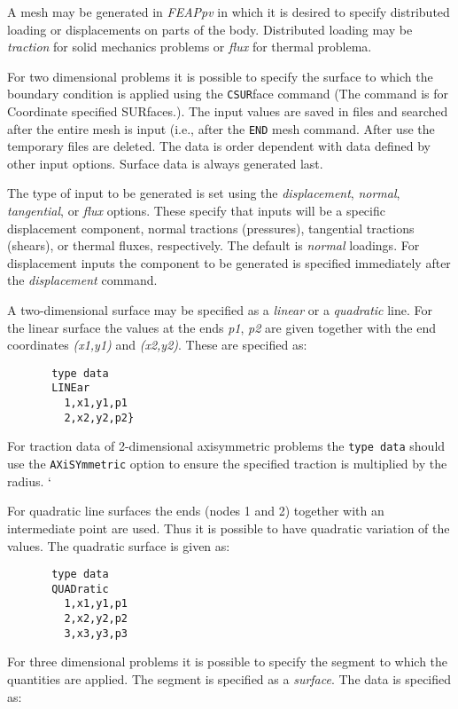 A mesh may be generated in {\sl FEAPpv} in which it is
desired to specify distributed loading or displacements on parts of the
body. Distributed loading may be  \textit{traction} for solid mechanics
problems or \textit{flux} for thermal problema.

For two dimensional problems it is possible to
specify the surface to which the boundary condition is applied
using the {\tt CSUR}face command (The command is for Coordinate
specified SURfaces.).
The input values are saved in files and searched
after the entire mesh is input (i.e., after the {\tt END} mesh command.
After use the temporary files are deleted.
The data is order dependent with data
defined by other input options.  Surface data is always generated last.

The type of input to be generated is set using the \textit{displacement},
\textit{normal}, \textit{tangential}, or \textit{flux}  options.  These specify that inputs
will be a specific
displacement component, normal tractions (pressures), tangential
tractions (shears), or thermal fluxes, respectively.  The default is \textit{normal} loadings.
For displacement inputs the component to be generated is specified
immediately after the {\it displacement} command.

A two-dimensional surface may be specified as a
{\it linear} or a {\it quadratic} line.  For the linear surface the
values at the ends {\it p1}, {\it p2} are given together with 
the end coordinates {\it (x1,y1)} and {\it (x2,y2)}.
These are specified as:

\begin{verbatim}
       type data
       LINEar
         1,x1,y1,p1
         2,x2,y2,p2}
\end{verbatim}
For traction data of 2-dimensional axisymmetric problems the \texttt{type data} should use
the \texttt{AXiSYmmetric} option to ensure the specified traction 
is multiplied by the radius.
`

For quadratic line surfaces the ends (nodes 1 and 2)
together with an intermediate point are used.  Thus it
is possible to have quadratic variation of the values.
The quadratic surface is given as:

\begin{verbatim}
       type data
       QUADratic
         1,x1,y1,p1
         2,x2,y2,p2
         3,x3,y3,p3
\end{verbatim}

For three dimensional problems it is possible to
specify the segment to which the quantities
are applied.  The segment is specified as a {\it surface}.
The data is specified as:

